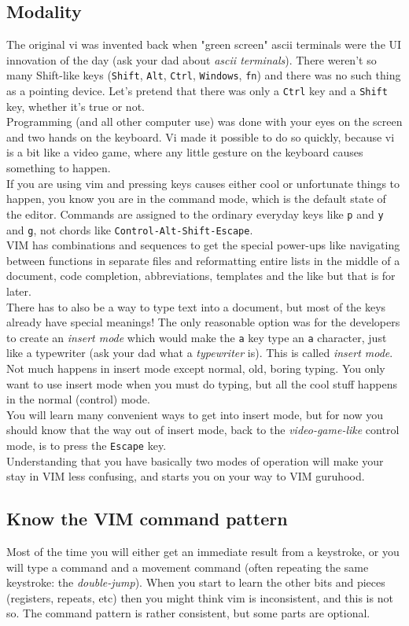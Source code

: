 \documentclass[a4paper, 12pt]{article}
\begin{document}
\subsection{Modality}
\label{"Modality"}
The original vi was invented back when "green screen" ascii terminals were the UI innovation of the day (ask your dad about {\it ascii terminals}). There weren't so many Shift-like keys ({\tt Shift}, {\tt Alt}, {\tt Ctrl}, {\tt Windows}, {\tt fn}) and there was no such thing as a pointing device. Let's pretend that there was only a {\tt Ctrl} key and a {\tt Shift} key, whether it's true or not.\\
Programming (and all other computer use) was done with your eyes on the screen and two hands on the keyboard. Vi made it possible to do so quickly, because vi is a bit like a video game, where any little gesture on the keyboard causes something to happen.\\
If you are using vim and pressing keys causes either cool or unfortunate things to happen, you know you are in the command mode, which is the default state of the editor. Commands are assigned to the ordinary everyday keys like {\tt p} and {\tt y} and {\tt g}, not chords like {\tt Control-Alt-Shift-Escape}.\\
VIM has combinations and sequences to get the special power-ups like navigating between functions in separate files and reformatting entire lists in the middle of a document, code completion, abbreviations, templates and the like but that is for later.\\
There has to also be a way to type text into a document, but most of the keys already have special meanings! The only reasonable option was for the developers to create an {\it insert mode} which would make the {\tt a} key type an {\tt a} character, just like a typewriter (ask your dad what a {\it typewriter} is). This is called {\it insert mode}. Not much happens in insert mode except normal, old, boring typing. You only want to use insert mode when you must do typing, but all the cool stuff happens in the normal (control) mode.\\
You will learn many convenient ways to get into insert mode, but for now you should know that the way out of insert mode, back to the {\it video-game-like} control mode, is to press the {\tt Escape} key.\\
Understanding that you have basically two modes of operation will make your stay in VIM less confusing, and starts you on your way to VIM guruhood.
\subsection{Know the VIM command pattern}
\label{"Know the VIM command pattern"}
Most of the time you will either get an immediate result from a keystroke, or you will type a command and a movement command (often repeating the same keystroke: the {\it double-jump}). When you start to learn the other bits and pieces (registers, repeats, etc) then you might think vim is inconsistent, and this is not so. The command pattern is rather consistent, but some parts are optional.
\end{document}
